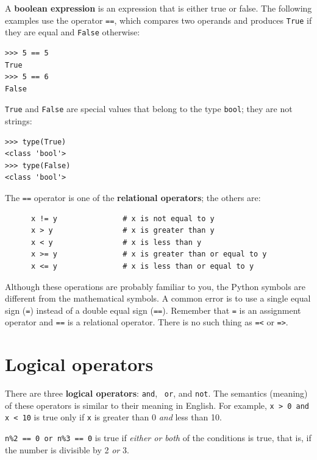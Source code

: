 \documentclass[10pt]{book}
\begin{document}
A {\bf boolean expression} is an expression that is either true
or false.  The following examples use the 
operator {\tt ==}, which compares two operands and produces
{\tt True} if they are equal and {\tt False} otherwise:

\begin{verbatim}
>>> 5 == 5
True
>>> 5 == 6
False
\end{verbatim}
%
{\tt True} and {\tt False} are special
values that belong to the type {\tt bool}; they are not strings:

\begin{verbatim}
>>> type(True)
<class 'bool'>
>>> type(False)
<class 'bool'>
\end{verbatim}
%
The {\tt ==} operator is one of the {\bf relational operators}; the
others are:

\begin{verbatim}
      x != y               # x is not equal to y
      x > y                # x is greater than y
      x < y                # x is less than y
      x >= y               # x is greater than or equal to y
      x <= y               # x is less than or equal to y
\end{verbatim}
%
Although these operations are probably familiar to you, the Python
symbols are different from the mathematical symbols.  A common error
is to use a single equal sign ({\tt =}) instead of a double equal sign
({\tt ==}).  Remember that {\tt =} is an assignment operator and
{\tt ==} is a relational operator.   There is no such thing as
{\tt =<} or {\tt =>}.


\section {Logical operators}

There are three {\bf logical operators}: {\tt and}, {\tt
or}, and {\tt not}.  The semantics (meaning) of these operators is
similar to their meaning in English.  For example,
{\tt x > 0 and x < 10} is true only if {\tt x} is greater than 0
{\em and} less than 10.

{\tt n\%2 == 0 or n\%3 == 0} is true if {\em either or both} of the
conditions is true, that is, if the number is divisible by 2 {\em or}
3.
\end{document}

